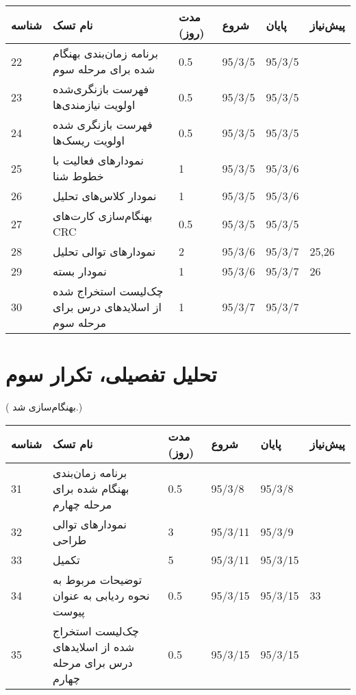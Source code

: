 \begin{tabular}[H]{ | l | l | l | l | l | l | }
	\hline
	شناسه & نام تسک & مدت (روز) & شروع & پایان & پیش‌نیاز    \\ \hline
	22 & برنامه زمان‌بندی  بهنگام شده برای مرحله سوم & 0.5   &   95/3/5 &   95/3/5 &      \\ \hline
	23 &  فهرست بازنگری‌شده اولویت نیازمندی‌ها & 0.5   &   95/3/5 &   95/3/5 &      \\ \hline
	24 &  فهرست بازنگری شده اولویت ریسک‌ها & 0.5   &   95/3/5 &   95/3/5 &      \\ \hline
	25 & نمودارهای فعالیت با خطوط شنا & 1   &   95/3/5 &   95/3/6 &      \\ \hline
	26 & نمودار کلاس‌های تحلیل & 1   &   95/3/5 &   95/3/6 &      \\ \hline
	27 & بهنگام‌سازی کارت‌های CRC & 0.5   &   95/3/5 &   95/3/5 &      \\ \hline
	28 & نمودارهای توالی تحلیل & 2   &   95/3/6 &   95/3/7 & 25,26    \\ \hline
	29 & نمودار بسته & 1   &   95/3/6 &   95/3/7 & 26    \\ \hline
	30 & چک‌‌لیست استخراج شده از اسلایدهای درس برای مرحله سوم & 1   &   95/3/7 &   95/3/7 &   \\ \hline
\end{tabular}

\section{تحلیل تفصیلی، تکرار سوم}	
({\color{red} بهنگام‌سازی شد.})

\begin{tabular}[H]{ | l | l | l | l | l | l | }
	\hline
	شناسه & نام تسک & مدت (روز) & شروع & پایان & پیش‌نیاز    \\ \hline
	31 & برنامه زمان‌بندی بهنگام شده برای مرحله چهارم & 0.5   &   95/3/8 &   95/3/8 &      \\ \hline
	32 & نمودارهای توالی طراحی & 3   &   95/3/11 &   95/3/9 &      \\ \hline
	33 & تکمیل \lr{Executable Architectural Baseline}  & 5   &   95/3/11 &   95/3/15 &     \\ \hline
	34 & توضیحات مربوط به نحوه ردیابی به عنوان پیوست & 0.5   &   95/3/15 &   95/3/15 & 33    \\ \hline
	35 & چک‌‌لیست استخراج شده از اسلایدهای درس برای مرحله چهارم & 0.5   &   95/3/15 &   95/3/15 &    \\ \hline
\end{tabular}


